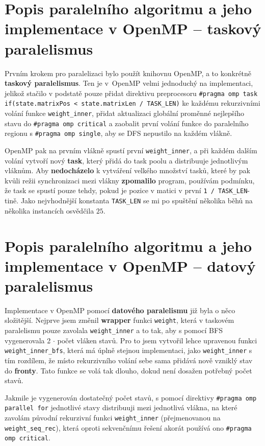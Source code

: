 \section{Popis paralelního algoritmu a jeho implementace v OpenMP -- taskový paralelismus}

Prvním krokem pro paralelizaci bylo použít knihovnu OpenMP, a to konkrétně \textbf{taskový paralelismus}. Ten je v~OpenMP velmi jednoduchý na implementaci, jelikož stačilo v podstatě pouze přidat direktivu preprocesoru \texttt{#pragma omp task if(state.matrixPos < state.matrixLen / TASK_LEN)} ke každému rekurzivními volání funkce \texttt{weight_inner}, přidat aktualizaci globální proměnné nejlepšího stavu do \texttt{#pragma omp critical} a zaobalit první volání funkce do paralelního regionu s \texttt{#pragma omp single}, aby se DFS nepustilo na každém vlákně.

OpenMP pak na prvním vlákně spustí první \texttt{weight_inner}, a při každém dalším volání vytvoří nový \textbf{task}, který přidá do task poolu a distribuuje jednotlivým vláknům. Aby \textbf{nedocházelo} k vytváření velkého množství tasků, které by pak kvůli režii synchronizaci mezi vlákny \textbf{zpomalilo} program, používám podmínku, že task se spustí pouze tehdy, pokud je pozice v matici v první \texttt{1 / TASK_LEN}-tině. Jako nejvhodnější konstanta \texttt{TASK_LEN} se mi po spuštění několika běhů na několika instancích osvědčila $25$.

\section{Popis paralelního algoritmu a jeho implementace v OpenMP -- datový paralelismus}

Implementace v OpenMP pomocí \textbf{datového paralelismu} již byla o něco složitější. Nejprve jsem změnil \textbf{wrapper} funkci \texttt{weight}, která v taskovém paralelismu pouze zavolala \texttt{weight_inner} a to tak, aby s pomocí BFS vygenerovala 2 $\cdot$ počet vláken stavů. Pro to jsem vytvořil lehce upravenou funkci \texttt{weight_inner_bfs}, která má úplně stejnou implementaci, jako \texttt{weight_inner} s tím rozdílem, že místo rekurzivního volání sebe sama přidává nově vzniklý stav do \textbf{fronty}. Tato funkce se volá tak dlouho, dokud není dosažen potřebný počet stavů.

Jakmile je vygenerován dostatečný počet stavů, s pomocí direktivy \texttt{#pragma omp parallel for} jednotlivé stavy distribuuji mezi jednotlivá vlákna, na které zavolám původní rekurzivní funkci \texttt{weight_inner} (přejmenovanou na \texttt{weight_seq_rec}), která oproti sekvenčnímu řešení akorát používá ono \texttt{#pragma omp critical}.

